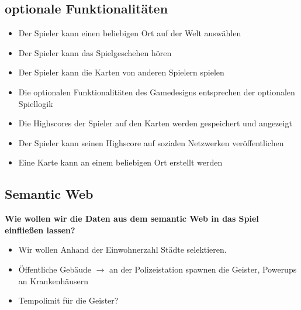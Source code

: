 \documentclass{article}
\begin{document}
\subsection{optionale Funktionalitäten}
\begin{itemize}
\item Der Spieler kann einen beliebigen Ort auf der Welt auswählen
\item Der Spieler kann das Spielgeschehen hören
\item Der Spieler kann die Karten von anderen Spielern spielen
\end{itemize}
\begin{itemize}
\item Die optionalen Funktionalitäten des Gamedesigns entsprechen der optionalen Spiellogik
\end{itemize}
\begin{itemize}
\item Die Highscores der Spieler auf den Karten werden gespeichert und angezeigt
\item Der Spieler kann seinen Highscore auf sozialen Netzwerken veröffentlichen
\end{itemize}
\begin{itemize}
\item Eine Karte kann an einem beliebigen Ort erstellt werden
\end{itemize}
\subsection{Semantic Web}

\textbf{Wie wollen wir die Daten aus dem semantic Web in das Spiel einfließen lassen?}

\begin{itemize}
\item Wir wollen Anhand der Einwohnerzahl Städte selektieren.
\item Öffentliche Gebäude $\rightarrow$ an der Polizeistation spawnen die Geister, Powerups an Krankenhäusern
\item Tempolimit für die Geister?
\end{itemize}
\end{document}
